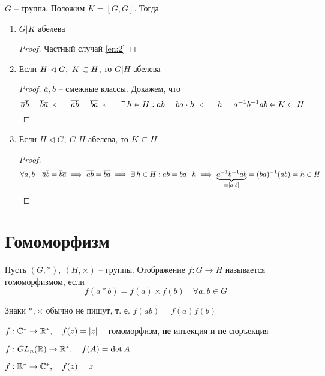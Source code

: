\begin{theorem}
	$ G $ -- группа. Положим $ K = [G, G] $. Тогда
    \begin{enumerate}
        \item \label{en:1} $ G | K $ абелева
        \begin{proof}
            Частный случай \ref{en:2}
        \end{proof}
        \item \label{en:2} Если $ H \vartriangleleft G, ~ K \subset H $, то $ G | H $ абелева
        \begin{proof}
            $ \overline{a}, \overline{b} $ -- смежные классы. Докажем, что
            $$ \overline{a}\overline{b} = \overline{b}\overline{a} \impliedby \overline{ab} = \overline{ba} \impliedby \exists\, h \in H : ab = ba \cdot h \impliedby h = a^{-1}b^{-1}ab \in K \subset H $$
        \end{proof}
        \item \label{en:3} Если $ H \vartriangleleft G, ~ G | H $ абелева, то $ K \subset H $
        \begin{proof}
            $$ \forall a, b \quad \overline{a} \overline{b} = \overline{b} \overline{a} \implies \overline{ab} = \overline{ba} \implies \exists\, h \in H : ab = ba \cdot h \implies \underbrace{a^{-1}b^{-1}ab}_{= [a, b]} = (ba)^{-1}(ab) = h \in H $$
        \end{proof}
    \end{enumerate}
\end{theorem}

\section{Гомоморфизм}

\begin{definition}
	Пусть $ (G, *), ~ (H, \times) $ -- группы. Отображение $ f : G \to H $ называется гомоморфизмом, если
    $$ f(a * b) = f(a) \times f(b) \quad \forall a, b \in G $$
\end{definition}

\begin{remark}
	Знаки $ *, \times $ обычно не пишут, т. е. $ f(ab) = f(a)f(b) $
\end{remark}

\begin{exmpls}
    \item $ f : \mathbb{C}^* \to \mathbb{R}^*, \quad f(z) = |z| $ -- гомоморфизм, \textbf{не} инъекция и \textbf{не} сюръекция
    \item $ f : GL_n(\mathbb{R}) \to \mathbb{R}^*, \quad f(A) = \det A $
    \item $ f : \mathbb{R}^* \to \mathbb{C}^*, \quad f(z) = z $
\end{exmpls}

